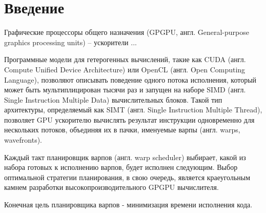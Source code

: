 \section{Введение}

Графические процессоры общего назначения (GPGPU, англ. General-purpose graphics processing units) -- ускорители ...

Программные модели для гетерогенных вычислений, такие как CUDA (англ. Compute Unified Device Architecture) или OpenCL (англ. Open Computing Language), позволяют описывать поведение одного потока исполнения, который может быть мультиплицирован тысячи раз и запущен на наборе SIMD (англ. Single Instruction Multiple Data) вычислительных блоков. Такой тип архитектуры, определяемый как SIMT (англ. Single Instruction Multiple Thread), позволяет GPU ускорителю вычислять результат инструкции одновременно для нескольких потоков, объединяя их в пачки, именуемые варпы (англ. warps, wavefronts). 

Каждый такт планировщик варпов (англ. warp scheduler) выбирает, какой из набора готовых к исполнению варпов, будет исполнен следующим. Выбор оптимальной стратегии планирования, в свою очередь, является краеугольным камнем разработки высокопроизводительного GPGPU вычислителя.

Конечная цель планировщика варпов - минимизация времени исполнения кода. 